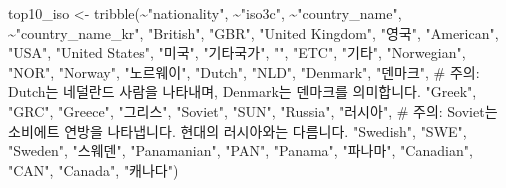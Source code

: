 \documentclass[
  letterpaper,
  chapter,a4paper,showtrims,openright,hidelinks]{oblivoir}
\newenvironment{Shaded}{\begin{snugshade}}{\end{snugshade}}
\newcommand{\CommentTok}[1]{\textcolor[rgb]{0.37,0.37,0.37}{#1}}
\newcommand{\FunctionTok}[1]{\textcolor[rgb]{0.28,0.35,0.67}{#1}}
\newcommand{\NormalTok}[1]{\textcolor[rgb]{0.00,0.23,0.31}{#1}}
\newcommand{\OtherTok}[1]{\textcolor[rgb]{0.00,0.23,0.31}{#1}}
\newcommand{\SpecialCharTok}[1]{\textcolor[rgb]{0.37,0.37,0.37}{#1}}
\newcommand{\StringTok}[1]{\textcolor[rgb]{0.13,0.47,0.30}{#1}}
\begin{document}
\begin{Shaded}
\begin{Highlighting}[]
\NormalTok{top10\_iso }\OtherTok{\textless{}{-}} \FunctionTok{tribble}\NormalTok{(}\SpecialCharTok{\textasciitilde{}}\StringTok{"nationality"}\NormalTok{, }\SpecialCharTok{\textasciitilde{}}\StringTok{"iso3c"}\NormalTok{, }\SpecialCharTok{\textasciitilde{}}\StringTok{"country\_name"}\NormalTok{, }\SpecialCharTok{\textasciitilde{}}\StringTok{"country\_name\_kr"}\NormalTok{,}
\StringTok{"British"}\NormalTok{, }\StringTok{"GBR"}\NormalTok{,  }\StringTok{"United Kingdom"}\NormalTok{, }\StringTok{"영국"}\NormalTok{,}
\StringTok{"American"}\NormalTok{, }\StringTok{"USA"}\NormalTok{,  }\StringTok{"United States"}\NormalTok{, }\StringTok{"미국"}\NormalTok{,}
\StringTok{"기타국가"}\NormalTok{, }\StringTok{""}\NormalTok{, }\StringTok{"ETC"}\NormalTok{, }\StringTok{"기타"}\NormalTok{,}
\StringTok{"Norwegian"}\NormalTok{, }\StringTok{"NOR"}\NormalTok{,  }\StringTok{"Norway"}\NormalTok{, }\StringTok{"노르웨이"}\NormalTok{,}
\StringTok{"Dutch"}\NormalTok{, }\StringTok{"NLD"}\NormalTok{,  }\StringTok{"Denmark"}\NormalTok{, }\StringTok{"덴마크"}\NormalTok{, }\CommentTok{\# 주의: Dutch는 네덜란드 사람을 나타내며, Denmark는 덴마크를 의미합니다.}
\StringTok{"Greek"}\NormalTok{, }\StringTok{"GRC"}\NormalTok{,  }\StringTok{"Greece"}\NormalTok{, }\StringTok{"그리스"}\NormalTok{,}
\StringTok{"Soviet"}\NormalTok{, }\StringTok{"SUN"}\NormalTok{, }\StringTok{"Russia"}\NormalTok{, }\StringTok{"러시아"}\NormalTok{, }\CommentTok{\# 주의: Soviet는 소비에트 연방을 나타냅니다. 현대의 러시아와는 다름니다.}
\StringTok{"Swedish"}\NormalTok{, }\StringTok{"SWE"}\NormalTok{,  }\StringTok{"Sweden"}\NormalTok{, }\StringTok{"스웨덴"}\NormalTok{,}
\StringTok{"Panamanian"}\NormalTok{, }\StringTok{"PAN"}\NormalTok{,  }\StringTok{"Panama"}\NormalTok{, }\StringTok{"파나마"}\NormalTok{,}
\StringTok{"Canadian"}\NormalTok{, }\StringTok{"CAN"}\NormalTok{,  }\StringTok{"Canada"}\NormalTok{, }\StringTok{"캐나다"}\NormalTok{)}


\end{Highlighting}
\end{Shaded}
\end{document}
